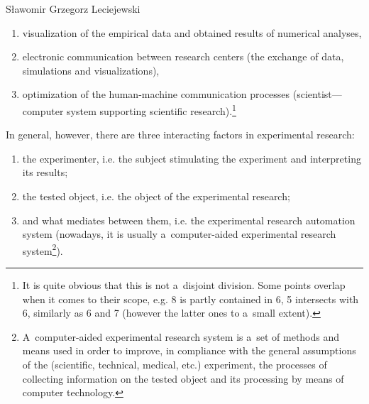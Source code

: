 \begin{artengenv}{Sławomir Grzegorz Leciejewski}
\begin{enumerate}
\item visualization of the empirical data and obtained results of numerical analyses,

\item electronic communication between research centers (the exchange of data, simulations and visualizations),

\item optimization of the human-machine communication processes (scientist---computer system supporting scientific research).\footnote{It is quite obvious that this is not a~disjoint division. Some points overlap when it comes to their scope, e.g. 8 is partly contained in 6, 5 intersects with 6, similarly as 6 and 7 (however the latter ones to a~small extent).}

\end{enumerate}

In general, however, there are three interacting factors in experimental research:



\begin{enumerate}[label=\Alph*.]

\item the experimenter, i.e. the subject stimulating the experiment and interpreting its results;

\item the tested object, i.e. the object of the experimental research;

\item and what mediates between them, i.e. the experimental research automation system (nowadays, it is usually a~computer-aided experimental research system\footnote{A~computer-aided experimental research system is a~set of methods and means used in order to improve, in compliance with the general assumptions of the (scientific, technical, medical, etc.) experiment, the processes of collecting information on the tested object and its processing by means of computer technology. }).

\end{enumerate}


\end{artengenv}
